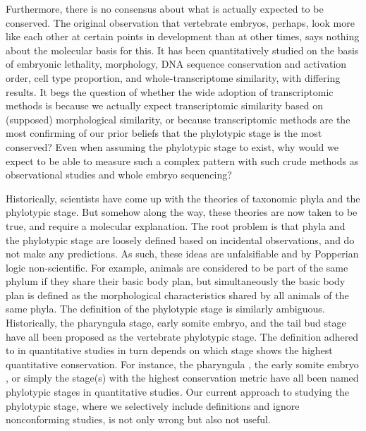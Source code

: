 Furthermore, there is no consensus about what is actually expected to be conserved. The original observation that vertebrate embryos, perhaps, look more like each other at certain points in development than at other times, says nothing about the molecular basis for this. It has been quantitatively studied on the basis of embryonic lethality\cite{Uchida2018}, morphology\cite{OlafRP2003,Cordero2020}, DNA sequence conservation\cite{Piasecka2013,Quint2012,Liu2021} and activation order\cite{Uesaka2019}, cell type proportion\cite{Mayshar2023}, and whole-transcriptome similarity\cite{Piasecka2013,Irie2011,marletaz2018,Liu2020,Leong2021,PerezPosada2022,Kalinka2010}, with differing results. It begs the question of whether the wide adoption of transcriptomic methods is because we actually expect transcriptomic similarity based on (supposed) morphological similarity, or because transcriptomic methods are the most confirming of our prior beliefs that the phylotypic stage is the most conserved? Even when assuming the phylotypic stage to exist, why would we expect to be able to measure such a complex pattern with such crude methods as observational studies and whole embryo sequencing?

Historically, scientists have come up with the theories of taxonomic phyla and the phylotypic stage. But somehow along the way, these theories are now taken to be true, and require a molecular explanation. The root problem is that phyla and the phylotypic stage are loosely defined based on incidental observations, and do not make any predictions. As such, these ideas are unfalsifiable and by Popperian logic non-scientific. For example, animals are considered to be part of the same phylum if they share their basic body plan, but simultaneously the basic body plan is defined as the morphological characteristics shared by all animals of the same phyla\cite{BUDD2000}. The definition of the phylotypic stage is similarly ambiguous. Historically, the pharyngula stage\cite{https://doi.org/10.1093/icb/21.2.391}, early somite embryo\cite{ https://doi.org/10.1046/j.1420-9101.1993.6030457.x}, and the tail bud stage \cite{Slack1993} have all been proposed as the vertebrate phylotypic stage. The definition adhered to in quantitative studies in turn depends on which stage shows the highest quantitative conservation. For instance, the pharyngula \cite{Irie2011,marletaz2018}, the early somite embryo \cite{DomazetLoso2010}, or simply the stage(s) with the highest conservation metric\cite{Kalinka2010,Cordero2020} have all been named phylotypic stages in quantitative studies. Our current approach to studying the phylotypic stage, where we selectively include definitions and ignore nonconforming studies, is not only wrong but also not useful.

